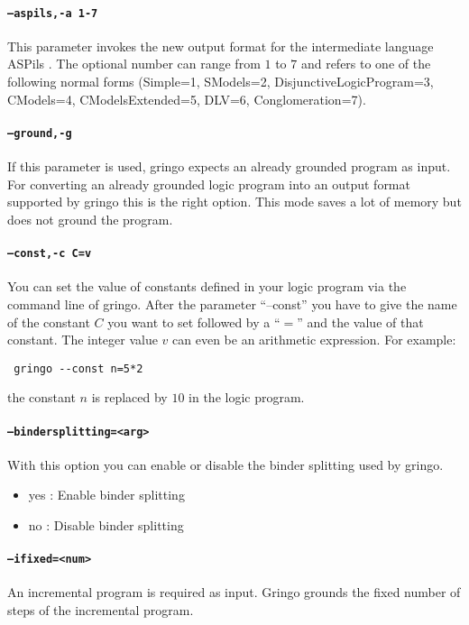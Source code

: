 \documentclass[a4paper,10pt]{article}
\begin{document}
\paragraph{\texttt{--aspils,-a 1-7}}
This parameter invokes the new output format for the intermediate language ASPils \cite{gejaosscth08b}. The optional number can range from $1$ to $7$ and refers to one of the following normal forms (Simple=1, SModels=2, DisjunctiveLogicProgram=3, CModels=4, CModelsExtended=5, DLV=6, Conglomeration=7).

\paragraph{\texttt{--ground,-g}}
If this parameter is used, gringo expects an already grounded program as input.
For converting an already grounded logic program into an output format 
supported by gringo this is the right option.
 This mode saves a lot of memory but does not ground the program.
\paragraph{\texttt{--const,-c C=v}}
You can set the value of constants defined in your logic program via the command line of gringo.
After the parameter ``--const'' you have to give the name of the constant $C$ you want to set followed by a ``$=$'' and the value of that constant. The integer value $v$ can even be an arithmetic expression. For example:
\begin{verbatim}
 gringo --const n=5*2
\end{verbatim}
the constant $n$ is replaced by $10$ in the logic program.
\paragraph{\texttt{--bindersplitting=<arg>}}
With this option you can enable or disable the binder splitting used by gringo.
\begin{itemize}
 \item yes : Enable binder splitting
 \item no  : Disable binder splitting
\end{itemize}
\paragraph{\texttt{--ifixed=<num>}}
An incremental program is required as input. Gringo grounds the fixed number of steps of the incremental program.
\end{document}
